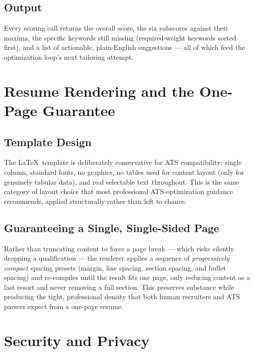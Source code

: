 \documentclass[10.5pt,letterpaper]{article}
\begin{document}
\subsection{Output}
Every scoring call returns the overall score, the six subscores against their maxima, the
specific keywords still missing (required-weight keywords sorted first), and a list of
actionable, plain-English suggestions --- all of which feed the optimization loop's next
tailoring attempt.

\newpage

\section{Resume Rendering and the One-Page Guarantee}

\subsection{Template Design}
The \LaTeX\ template is deliberately conservative for ATS compatibility: single column,
standard fonts, no graphics, no tables used for content layout (only for genuinely tabular
data), and real selectable text throughout. This is the same category of layout choice that
most professional ATS-optimization guidance recommends, applied structurally rather than
left to chance.

\subsection{Guaranteeing a Single, Single-Sided Page}
Rather than truncating content to force a page break --- which risks silently dropping a
qualification --- the renderer applies a sequence of \emph{progressively compact} spacing
presets (margin, line spacing, section spacing, and bullet spacing) and re-compiles until the
result fits one page, only reducing content as a last resort and never removing a full
section. This preserves substance while producing the tight, professional density that both
human recruiters and ATS parsers expect from a one-page resume.

\newpage

\section{Security and Privacy}
\end{document}
